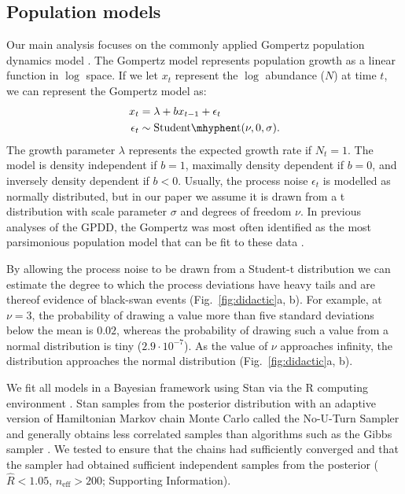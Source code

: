 \subsection{Population models}

Our main analysis focuses on the commonly applied Gompertz population dynamics
model \citep[e.g.][]{knape2012,dennis2014,connors2014}. The Gompertz model
represents population growth as a linear function in $\log$ space. If we let
$x_t$ represent the $\log$ abundance ($N$) at time $t$, we can represent the
Gompertz model as:
\begin{align*}
x_t &= \lambda + b x_{t-1} + \epsilon_t\\
\epsilon_t &\sim \mathrm{Student\mhyphen t}(\nu, 0, \sigma).
\end{align*}
The growth parameter $\lambda$ represents the expected growth rate if $N_t =
1$. The model is density independent if $b = 1$, maximally density dependent if
$b = 0$, and inversely density dependent if $b < 0$. Usually, the process noise
$\epsilon_t$ is modelled as normally distributed, but in our paper we assume it
is drawn from a t distribution with scale parameter $\sigma$ and degrees of
freedom $\nu$. In previous analyses of the GPDD, the Gompertz was most often
identified as the most parsimonious population model that can be fit to these
data \citep{brook2006}.

By allowing the process noise to be drawn from a Student-t distribution we can
estimate the degree to which the process deviations have heavy tails and are
thereof evidence of black-swan events (Fig.~\ref{fig:didactic}a, b). For
example, at $\nu = 3$, the probability of drawing a value more than five
standard deviations below the mean is $0.02$, whereas the probability of
drawing such a value from a normal distribution is tiny ($2.9\cdot10^{-7}$). As
the value of $\nu$ approaches infinity, the distribution approaches the normal
distribution (Fig.~\ref{fig:didactic}a, b).

We fit all models in a Bayesian framework using Stan \citep{stan-manual2014}
via the R computing environment \citep{r2014}. Stan samples from the posterior
distribution with an adaptive version of Hamiltonian Markov chain Monte Carlo
called the No-U-Turn Sampler and generally obtains less correlated samples
than algorithms such as the Gibbs sampler \citep{hoffman2014}. We tested to
ensure that the chains had sufficiently converged and that the sampler had
obtained sufficient independent samples from the posterior ($\widehat{R} <
1.05$, $n_\mathrm{eff} > 200$; Supporting Information).

